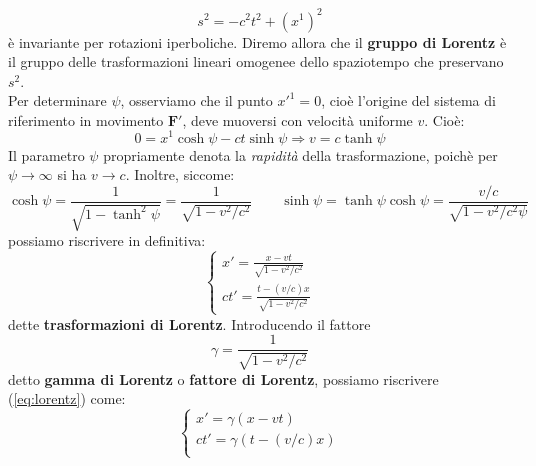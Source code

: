 \documentclass[a4paper,11pt]{book}
\theoremstyle{plain}
\theoremstyle{definition}
\begin{document}
\[
s^2=-c^2t^2+(x^1)^2
\]
è invariante per rotazioni iperboliche. Diremo allora che il \textbf{gruppo di Lorentz} è il gruppo delle trasformazioni lineari omogenee dello spaziotempo che preservano $s^2$. 
\\
Per determinare $\psi$, osserviamo che il punto $x'^1=0$, cioè l'origine del sistema di riferimento in movimento $\textbf{F}'$, deve muoversi con velocità uniforme $v$. Cioè:
\[
0=x^1\cosh\psi-ct\sinh\psi \Longrightarrow v=c\tanh\psi
\]
Il parametro $\psi$ propriamente denota la \emph{rapidità} della trasformazione, poichè per $\psi\to\infty$ si ha $v\to c$. Inoltre, siccome:
\[
\cosh\psi=\frac{1}{\sqrt{1-\tanh^2\psi}}= \frac{1}{\sqrt{1-v^2/c^2}}\qquad \sinh\psi=\tanh\psi\cosh\psi=\frac{v/c}{\sqrt{1-v^2/c^2\psi}}
\]
possiamo riscrivere in definitiva:
\begin{equation}\label{eq:lorentz}
\begin{cases}
x'=\frac{x-vt}{\sqrt{1-v^2/c^2}}\\
ct'=\frac{t-(v/c)x}{\sqrt{1-v^2/c^2}}
\end{cases}
\end{equation}
dette \textbf{trasformazioni di Lorentz}. Introducendo il fattore
\[
\gamma=\frac{1}{\sqrt{1-v^2/c^2}}
\]
detto \textbf{gamma di Lorentz} o \textbf{fattore di Lorentz}, possiamo riscrivere (\ref{eq:lorentz}) come:
\[
\begin{cases}
x'=\gamma(x-vt) \\
ct'=\gamma(t-(v/c)x) \\
\end{cases}
\]
\end{document}
